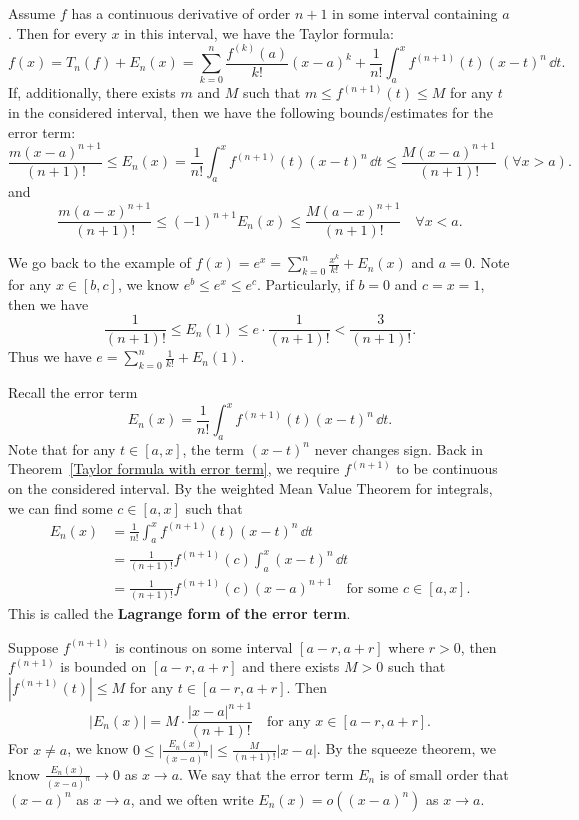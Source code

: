 \documentclass[a4paper]{ctexart}
\begin{document}
    \begin{mythm}\label{Taylor formula with error term}
        Assume $f$ has a continuous derivative of order $n+1$ in some interval containing $a$. Then for every $x$ in this interval, we have the Taylor formula:
        \[
        f(x) = T_n(f) + E_n(x) = \sum_{k=0}^n \frac{f^{(k)}(a)}{k!} (x-a)^k + \frac{1}{n!} \int_a^x f^{(n+1)}(t) (x-t)^n\, \dd t.
        \]
        If, additionally, there exists $m$ and $M$ such that $m \le f^{(n+1)}(t) \le M$ for any $t$ in the considered interval, then we have the following bounds/estimates for the error term:
        \[
        \frac{m(x-a)^{n+1}}{(n+1)!} \le E_n(x) = \frac{1}{n!} \int_a^x f^{(n+1)}(t) (x-t)^n\, \dd t \le \frac{M(x-a)^{n+1}}{(n+1)!} \ (\forall x>a).
        \]
        and
        \[
        \frac{m(a-x)^{n+1}}{(n+1)!} \le (-1)^{n+1} E_n(x)  \le \frac{M(a-x)^{n+1}}{(n+1)!} \quad \forall x<a.
        \]
        \end{mythm}
        \begin{myex}
            We go back to the example of $\displaystyle f(x) = e^x=\sum_{k=0}^n \frac{x^k}{k!} + E_n(x)$ and $a=0$. Note for any $x\in [b,c]$, we know $e^b \le e^x \le e^c$. Particularly, if $b=0$ and $c=x=1$, then we have
            \[
            \frac{1}{(n+1)!} \le E_n(1) \le e\cdot \frac{1}{(n+1)!} < \frac{3}{(n+1)!}.
            \]
            Thus we have $\displaystyle e=\sum_{k=0}^n \frac{1}{k!} + E_n(1)$.
        \end{myex}
        \begin{myrmk}
            Recall the error term
            \[
            E_n(x) = \frac{1}{n!} \int_a^x f^{(n+1)}(t) (x-t)^n\, \dd t.
            \]
            Note that for any $t\in [a,x]$, the term $(x-t)^n$ never changes sign. Back in Theorem~\ref{Taylor formula with error term}, we require $f^{(n+1)}$ to be continuous on the considered interval. By the weighted Mean Value Theorem for integrals, we can find some $c\in [a,x]$ such that
            \[
            \begin{aligned}
                E_n(x) &= \frac{1}{n!} \int_a^x f^{(n+1)}(t) (x-t)^n\, \dd t\\
                &= \frac{1}{(n+1)!} f^{(n+1)}(c) \int_a^x (x-t)^n\, \dd t\\
                &= \frac{1}{(n+1)!} f^{(n+1)}(c) (x-a)^{n+1}\quad \text{for some } c\in [a,x].
            \end{aligned}
            \]
            This is called the \textbf{Lagrange form of the error term}.

            Suppose $f^{(n+1)}$ is continous on some interval $[a-r,a+r]$ where $r>0$, then $f^{(n+1)}$ is bounded on $[a-r,a+r]$ and there exists $M>0$ such that $|f^{(n+1)}(t)| \le M$ for any $t\in [a-r,a+r]$. Then
            \[
            |E_n(x)| = M \cdot \frac{|x-a|^{n+1}}{(n+1)!} \quad \text{for any } x\in [a-r,a+r].
            \]
            For $x\neq a$, we know $\displaystyle 0 \le \big|\frac{E_n(x)}{(x-a)^{n}}\big| \le \frac{M}{(n+1)!}|x-a|$. By the squeeze theorem, we know $\displaystyle \frac{E_n(x)}{(x-a)^{n}} \to 0$ as $x \to a$. We say that the error term $E_n$ is of small order that $(x-a)^n$ as $x\to a$, and we often write $E_n(x) = o\left( (x-a)^n \right)$ as $x\to a$.
        \end{myrmk}
\end{document}
